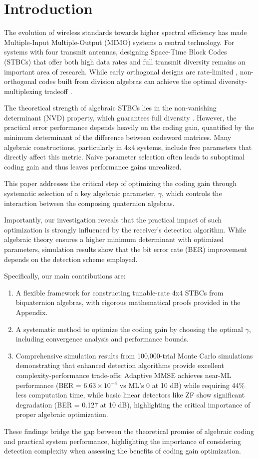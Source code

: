 \section{Introduction}
The evolution of wireless standards towards higher spectral efficiency has made Multiple-Input Multiple-Output (MIMO) systems a central technology. 
For systems with four transmit antennas, designing Space-Time Block Codes (STBCs) that offer both high data rates and full transmit diversity remains an important area of research. 
While early orthogonal designs are rate-limited \cite{1}, non-orthogonal codes built from division algebras can achieve the optimal diversity-multiplexing tradeoff \cite{2,3}.

The theoretical strength of algebraic STBCs lies in the non-vanishing determinant (NVD) property, which guarantees full diversity \cite{4}. However, the practical error performance depends heavily on the coding gain, quantified by the minimum determinant of the difference between codeword matrices. 
Many algebraic constructions, particularly in 4x4 systems, include free parameters that directly affect this metric. 
Naive parameter selection often leads to suboptimal coding gain and thus leaves performance gains unrealized.

This paper addresses the critical step of optimizing the coding gain through systematic selection of a key algebraic parameter, \(\gamma\), which controls the interaction between the composing quaternion algebras.

Importantly, our investigation reveals that the practical impact of such optimization is strongly influenced by the receiver's detection algorithm. 
While algebraic theory ensures a higher minimum determinant with optimized parameters, simulation results show that the bit error rate (BER) improvement depends on the detection scheme employed.

Specifically, our main contributions are:
\begin{enumerate}
    \item A flexible framework for constructing tunable-rate 4x4 STBCs from biquaternion algebras, with rigorous mathematical proofs provided in the Appendix.
    \item A systematic method to optimize the coding gain by choosing the optimal \(\gamma\), including convergence analysis and performance bounds.
    \item Comprehensive simulation results from 100,000-trial Monte Carlo simulations demonstrating that enhanced detection algorithms provide excellent complexity-performance trade-offs: Adaptive MMSE achieves near-ML performance (BER = $6.63 \times 10^{-4}$ vs ML's 0 at 10 dB) while requiring 44\% less computation time, while basic linear detectors like ZF show significant degradation (BER = 0.127 at 10 dB), highlighting the critical importance of proper algebraic optimization.
\end{enumerate}

These findings bridge the gap between the theoretical promise of algebraic coding and practical system performance, highlighting the importance of considering detection complexity when assessing the benefits of coding gain optimization.
